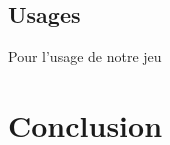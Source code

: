 \documentclass[a4paper, 11pt]{article}
\begin{document}
\subsection{Usages}
Pour l'usage de notre jeu
\section{Conclusion}
\end{document}
